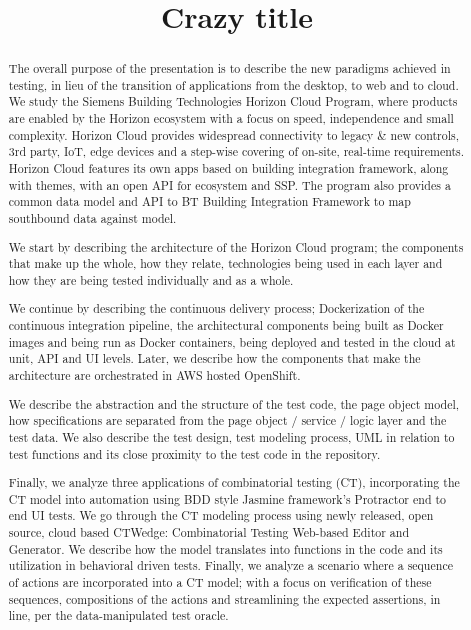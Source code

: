 \documentclass[conference]{IEEEtran}
\begin{document}
\title{Crazy title}


\author{
}

\maketitle


\begin{abstract}
The overall purpose of the presentation is to describe the new paradigms achieved in testing,
in lieu of the transition of applications from the desktop, to web and to cloud. 
We study the Siemens Building Technologies Horizon Cloud Program,
where products are enabled by the Horizon ecosystem with a focus on speed, independence and small complexity.
Horizon Cloud provides widespread connectivity to legacy \& new controls, 3rd party, IoT, 
edge devices and a step-wise covering of on-site, real-time requirements. 
Horizon Cloud features its own apps based on building integration framework, along with themes, with an open API for ecosystem and SSP. 
The program also provides a common data model and API to BT Building Integration Framework to map southbound data against model.

We start by describing the architecture of the Horizon Cloud program; the components that make up the whole, how they relate, 
technologies being used in each layer and how they are being tested individually and as a whole. 	

We continue by describing the continuous delivery process; Dockerization of the continuous integration pipeline,
the architectural components being built as Docker images and being run as Docker containers, being deployed and tested in the cloud at unit, API and UI levels. Later, we describe how the components that make the architecture are orchestrated in AWS hosted OpenShift. 

We describe the abstraction and the structure of the test code, the page object model, 
how specifications are separated from the page object / service / logic layer and the test data. We also describe the test design, test modeling process, UML in relation to test functions and its close proximity to the test code in the repository.

Finally, we analyze three applications of combinatorial testing (CT),
incorporating the CT model into automation using BDD style Jasmine framework’s Protractor end to end UI tests. 
We go through the CT modeling process using newly released, open source, cloud based
CTWedge: Combinatorial Testing Web-based Editor and Generator. 
We describe how the model translates into functions in the code and its utilization in behavioral driven tests.
Finally, we analyze a scenario where a sequence of actions are incorporated into a CT model;
with a focus on verification of these sequences, compositions of the actions and streamlining the expected assertions,
in line, per the data-manipulated test oracle.


\end{abstract}
\end{document}
